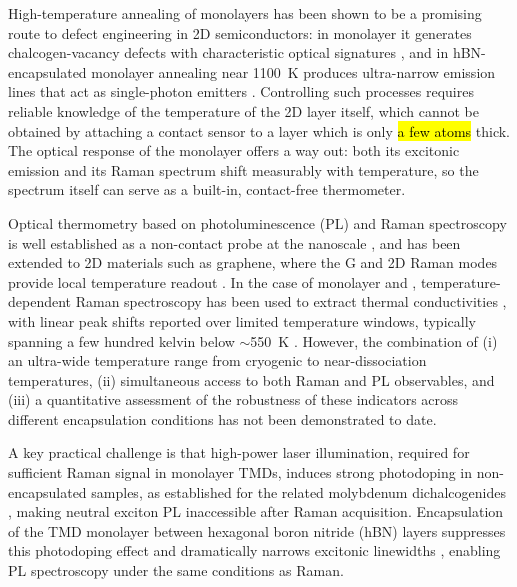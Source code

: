 \documentclass[letterpaper]{article}
\DeclareRobustCommand{\rev}[1]{#1}
\DeclareRobustCommand{\revB}[1]{\hl{#1}}
\begin{document}
High-temperature annealing \rev{of monolayers has been shown to be a promising} route
to defect engineering in 2D semiconductors: in monolayer  it generates chalcogen-vacancy defects
with characteristic optical signatures \cite{mitterreiter-2021}, and in
hBN-encapsulated monolayer  annealing near 1100~K produces ultra-narrow
emission lines that act as single-photon emitters \cite{lee-2026d}. Controlling
such processes requires reliable knowledge of the temperature of the 2D layer
itself, which cannot be obtained by attaching a contact sensor to a layer \rev{which
is only} \revB{a few atoms} thick. The optical response of the monolayer offers a way out: both its
excitonic emission and its Raman spectrum shift measurably with temperature, so
the spectrum itself can serve as a built-in, contact-free thermometer.

Optical thermometry based on photoluminescence (PL) and Raman spectroscopy is
well established as a non-contact probe at the nanoscale \cite{brites-2012},
and has been extended to 2D materials such as graphene, where the G and 2D
Raman modes provide local temperature readout \cite{calizo-2007}. In the case of
monolayer  and , temperature-dependent Raman spectroscopy has
been used to extract thermal conductivities \cite{yan-2014,sahoo-2013}, with
linear peak shifts reported over limited temperature windows, typically
spanning a few hundred kelvin below $\sim$550~K \cite{huang-2016,lanzillo-2013}. However, the combination of (i) an ultra-wide
temperature range from cryogenic to near-dissociation temperatures, (ii)
simultaneous access to both Raman and PL observables, and (iii) a quantitative
assessment of the robustness of these indicators across different encapsulation
conditions has not been demonstrated to date.

A key practical challenge is that high-power laser illumination, required for
sufficient Raman signal in monolayer TMDs, induces strong photodoping in
non-encapsulated samples, as established for the related molybdenum
dichalcogenides \cite{cadiz-2016}, making \rev{neutral exciton} PL inaccessible after Raman
acquisition. Encapsulation of the TMD monolayer between hexagonal boron nitride
(hBN) layers suppresses this photodoping effect \cite{cadiz-2016} and
dramatically narrows excitonic linewidths \cite{cadiz-2017,ajayi-2017}, enabling PL
spectroscopy under the same conditions as Raman.
\end{document}
